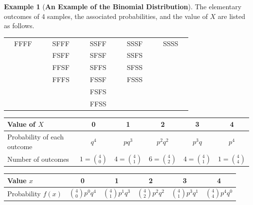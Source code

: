 \documentclass[12pt,openany]{book}
\theoremstyle{definition}
\newtheorem{example}{Example}[chapter]
\begin{document}
	\begin{example}[\bf An Example of the Binomial Distribution]
		The elementary outcomes of 4 samples, the associated probabilities, and the value of $X$ are listed as follows. \begin{center}
			\begin{tabular}{ccc ccc ccc ccc ccc}
				& FFFF &&& SFFF &&& SSFF &&& SSSF &&& SSSS & \\
				& 	   &&& FSFF &&& SFSF &&& SSFS &&& & \\
				& 	   &&& FFSF &&& SFFS &&& SFSS &&& & \\
				& 	   &&& FFFS &&& FSSF &&& FSSS &&& & \\
				& 	   &&&      &&& FSFS &&& &&& & \\
				& 	   &&&      &&& FFSS &&& &&& & \\
		\end{tabular}\end{center}
		\begin{center}\renewcommand*{\arraystretch}{1.4}\begin{tabularx}{\textwidth}{X||c|c|c|c|c}
				\toprule[1.2pt]
				Value of $X$ & 0 & 1 & 2 & 3 & 4 \\
				\hline\hline
				Probability of each outcome & $q^4$ & $pq^3$ & $p^2q^2$ & $p^3q$ & $p^4$ \\
				\hline
				Number of outcomes & $1=\binom{4}{0}$ & $4=\binom{4}{1}$ & $6=\binom{4}{2}$ & $4=\binom{4}{1}$ & $1=\binom{4}{4}$ \\
				\bottomrule[1.2pt] 
		\end{tabularx}\end{center}
		\begin{center}\renewcommand*{\arraystretch}{1.4}\begin{tabularx}{\textwidth}{X||c|c|c|c|c}
				\toprule[1.2pt]
				Value $x$ & 0 & 1 & 2 & 3 & 4 \\
				\hline\hline
				Probability $f(x)$ & $\binom{4}{0}p^0q^4$ & $\binom{4}{1}p^1q^3$ & $\binom{4}{2}p^2q^2$ & $\binom{4}{1}p^3q^1$ & $\binom{4}{4}p^4q^0$ \\
				\bottomrule[1.2pt]
			\end{tabularx}
		\end{center}
	\end{example}
	\vspace{10pt}
\end{document}
